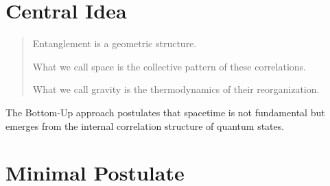 \documentclass[11pt]{article}
\begin{document}
\begin{abstract}
The Ollivier--Ricci curvature analysis provides the clearest numerical
signal obtained so far for a coupling of the form
\[
\text{local informational defect}
\;\Longrightarrow\;
\text{emergent geometric curvature},
\]
with a response that grows with perturbation intensity and is more
localized for compact defects.

A first phenomenological extension to the SPARC galactic sample
suggests that a single-phase description is not the most natural:
current fits point toward distinct effective regimes, with optimal
dimensions
\[
d_{\min}^{\mathrm{massive}} = 2.4871 \pm 0.0294,
\qquad
d_{\min}^{\mathrm{dwarf}} = 2.2744 \pm 0.0341.
\]

We further show that the effective transition scale $r_{\mathrm{trans}}$
is not an arbitrary parameter but an observable correlated with the
baryonic and geometric structure of galaxies. A global multivariate
scaling law, followed by regime separation, leads to a falsifiable
prediction independent of rotation curves: the radial structure of
the lensing excess differs between galactic regimes.

This part should be interpreted as a phenomenological proof of concept
linking bottom-up emergent geometry to real astrophysical data.

\end{abstract}


\section{Central Idea}

\begin{quote}
Entanglement is a geometric structure.

What we call space is the collective pattern of these correlations.

What we call gravity is the thermodynamics of their reorganization.
\end{quote}

The Bottom-Up approach postulates that spacetime is not fundamental
but emerges from the internal correlation structure of quantum states.

\section{Minimal Postulate}
\end{document}
